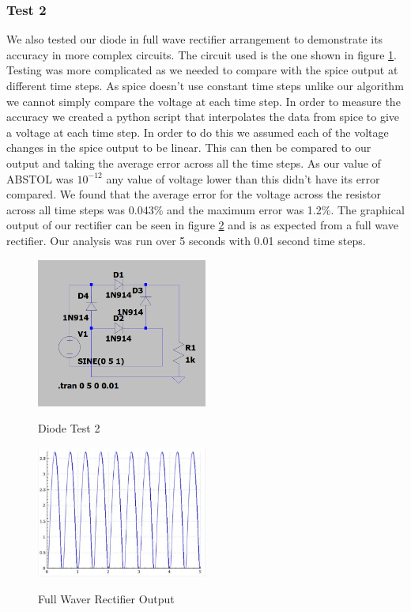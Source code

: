 \documentclass{article}
\begin{document}
\subsubsection{Test 2}
We also tested our diode in full wave rectifier arrangement to demonstrate its accuracy in more complex circuits. The circuit used is the one shown in figure \ref{fig:DiodeTest2}. Testing was more complicated as we needed to compare with the spice output at different time steps. As spice doesn't use constant time steps unlike our algorithm we cannot simply compare the voltage at each time step. In order to measure the accuracy we created a python script that interpolates the data from spice to give a voltage at each time step. In order to do this we assumed each of the voltage changes in the spice output to be linear. This can then be compared to our output and taking the average error across all the time steps. As our value of ABSTOL was $10^{-12}$ any value of voltage lower than this didn't have its error compared. We found that the average error for the voltage across the resistor across all time steps was 0.043\% and the maximum error was 1.2\%. The graphical output of our rectifier can be seen in figure \ref{fig:FullWaveRec} and is as expected from a full wave rectifier. Our analysis was run over 5 seconds with 0.01 second time steps. 
\begin{figure}[h]
    \caption{Diode Test 2}
    \centering
    \includegraphics[width=0.5\textwidth]{images/DiodeTest2.png}
    \label{fig:DiodeTest2}
\end{figure}
\begin{figure}[h]
    \caption{Full Waver Rectifier Output}
    \centering
    \includegraphics[width=0.5\textwidth]{images/FullWaveRec.png}
    \label{fig:FullWaveRec}
\end{figure}
\newpage
\end{document}
